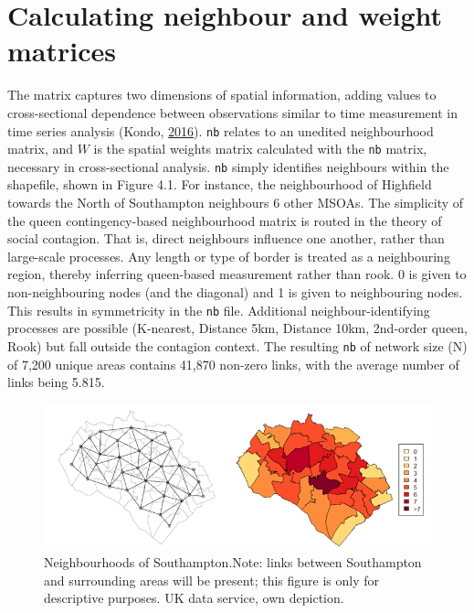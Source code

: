 \documentclass[12pt,twoside]{reedthesis}
\begin{document}
\hypertarget{calculating-neighbour-and-weight-matrices}{%
\section{Calculating neighbour and weight matrices}\label{calculating-neighbour-and-weight-matrices}}

The matrix captures two dimensions of spatial information, adding values to cross-sectional dependence between observations similar to time measurement in time series analysis (Kondo, \protect\hyperlink{ref-kondo2016}{2016}). \texttt{nb} relates to an unedited neighbourhood matrix, and \(W\) is the spatial weights matrix calculated with the \texttt{nb} matrix, necessary in cross-sectional analysis. \texttt{nb} simply identifies neighbours within the shapefile, shown in Figure 4.1. For instance, the neighbourhood of Highfield towards the North of Southampton neighbours 6 other MSOAs. The simplicity of the queen contingency-based neighbourhood matrix is routed in the theory of social contagion. That is, direct neighbours influence one another, rather than large-scale processes. Any length or type of border is treated as a neighbouring region, thereby inferring queen-based measurement rather than rook. 0 is given to non-neighbouring nodes (and the diagonal) and 1 is given to neighbouring nodes. This results in symmetricity in the \texttt{nb} file. Additional neighbour-identifying processes are possible (K-nearest, Distance 5km, Distance 10km, 2nd-order queen, Rook) but fall outside the contagion context. The resulting \texttt{nb} of network size (N) of 7,200 unique areas contains 41,870 non-zero links, with the average number of links being 5.815.
\begin{figure}
\includegraphics[width=0.95\linewidth]{figure/Figure_3} \caption{Neighbourhoods of Southampton.Note: links between Southampton and surrounding areas will be present; this figure is only for descriptive purposes. UK data service, own depiction.}\label{fig:figure3}
\end{figure}
\end{document}
